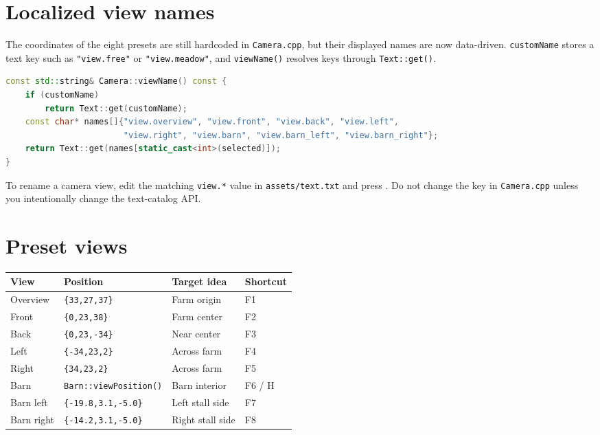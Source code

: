 \documentclass[11pt,a4paper,openany]{book}
\newcommand{\code}[1]{\texttt{#1}}
\newcommand{\file}[1]{\nolinkurl{#1}}
\newcommand{\keycap}[1]{\begingroup\setlength{\fboxsep}{0.8pt}\raisebox{0.05ex}{\fbox{\footnotesize\texttt{#1}}}\endgroup}
\begin{document}
\section{Localized view names}
The coordinates of the eight presets are still hardcoded in \file{Camera.cpp}, but their displayed names are now data-driven. \code{customName} stores a text key such as \code{"view.free"} or \code{"view.meadow"}, and \code{viewName()} resolves keys through \code{Text::get()}.

\begin{lstlisting}[language=C++]
const std::string& Camera::viewName() const {
    if (customName)
        return Text::get(customName);
    const char* names[]{"view.overview", "view.front", "view.back", "view.left",
                        "view.right", "view.barn", "view.barn_left", "view.barn_right"};
    return Text::get(names[static_cast<int>(selected)]);
}
\end{lstlisting}

\begin{editbox}
	To rename a camera view, edit the matching \code{view.*} value in \file{assets/text.txt} and press \keycap{F9}. Do not change the key in \file{Camera.cpp} unless you intentionally change the text-catalog API.
\end{editbox}

\section{Preset views}
\begin{longtable}{@{}llll@{}}
	\toprule
	View       & Position                    & Target idea      & Shortcut \\
	\midrule
	\endhead
	Overview   & \code{\{33,27,37\}}         & Farm origin      & F1       \\
	Front      & \code{\{0,23,38\}}          & Farm center      & F2       \\
	Back       & \code{\{0,23,-34\}}         & Near center      & F3       \\
	Left       & \code{\{-34,23,2\}}         & Across farm      & F4       \\
	Right      & \code{\{34,23,2\}}          & Across farm      & F5       \\
	Barn       & \code{Barn::viewPosition()} & Barn interior    & F6 / H   \\
	Barn left  & \code{\{-19.8,3.1,-5.0\}}   & Left stall side  & F7       \\
	Barn right & \code{\{-14.2,3.1,-5.0\}}   & Right stall side & F8       \\
	\bottomrule
\end{longtable}
\end{document}
